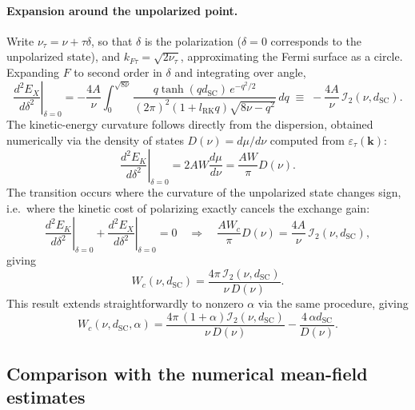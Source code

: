 \paragraph{Expansion around the unpolarized point.} Write $\nu_\tau = \nu + \tau\delta$, so that $\delta$ is the polarization ($\delta=0$ corresponds to the unpolarized state), and $k_{F\tau} =\sqrt{2\nu_{\tau}}$, approximating the Fermi surface as a circle. Expanding $F$ to second order in $\delta$ and integrating over angle,
\begin{equation}
    \left. \frac{d^2 E_X}{d \delta^2} \right|_{\delta=0} = -\frac{4A}{\nu} \int_0^{\sqrt{8\nu}} \frac{q \tanh(qd_{\text{SC}})\, e^{-q^2/2}}{{(2\pi)}^2 (1+l_{\text{RK}} q)\sqrt{8\nu - q^2}}\, dq \;\equiv\; -\frac{4A}{\nu}\, \mathcal{I}_2(\nu, d_{\text{SC}}).
    \label{eq:exchange_curvature}
\end{equation}
The kinetic-energy curvature follows directly from the dispersion, obtained numerically via the density of states $D(\nu)=d\mu/d\nu$ computed from $\varepsilon_\tau(\mathbf{k})$:
\begin{equation}
    \left. \frac{d^2 E_K}{d \delta^2} \right|_{\delta=0} = 2 A W \frac{d\mu}{d\nu} = \frac{A W}{\pi} D(\nu).
    \label{eq:kinetic_curvature}
\end{equation}
The transition occurs where the curvature of the unpolarized state changes sign, i.e.\ where the kinetic cost of polarizing exactly cancels the exchange gain:
\begin{equation}
    \left. \frac{d^2 E_K}{d\delta^2} \right|_{\delta=0} + \left. \frac{d^2 E_X}{d\delta^2} \right|_{\delta=0} = 0
    \quad\Longrightarrow\quad
    \frac{AW_c}{\pi} D(\nu) = \frac{4A}{\nu}\,\mathcal{I}_2(\nu, d_{\text{SC}}),
    \label{eq:wc_condition}
\end{equation}
giving
\begin{equation}
    W_c(\nu, d_{\text{SC}}) = \frac{4\pi\, \mathcal{I}_2(\nu, d_{\text{SC}})}{\nu\, D(\nu)}.
    \label{eq:wc_formula}
\end{equation}
This result extends straightforwardly to nonzero $\alpha$ via the same procedure, giving
\begin{equation}
    W_c(\nu, d_{\text{SC}}, \alpha) = \frac{4\pi\, (1+\alpha) \mathcal{I}_2(\nu, d_{\text{SC}})}{\nu\, D(\nu)}  - \frac{4\, \alpha d_{\text{SC}}}{D(\nu)}.
    \label{eq:wc_formula_alpha}
\end{equation}

\subsection{Comparison with the numerical mean-field estimates}


